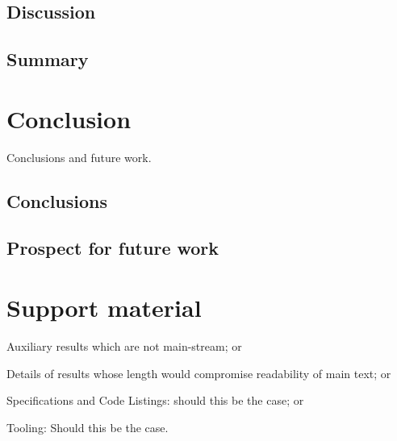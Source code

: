 \documentclass[oneside,11pt,a4paper,footinclude=true,headinclude=true,cleardoublepage=empty]{scrbook}
\begin{document}
    \section{Discussion}
	\section{Summary}

	\chapter{Conclusion}
		Conclusions and future work.
	\section{Conclusions}
	\section{Prospect for future work}
			

	

	
	
	
	\chapter{Support material}
	Auxiliary results which are not main-stream; or

	Details of results whose length would compromise readability of main text; or

	Specifications and Code Listings: should this be the case; or

	Tooling: Should this be the case.



\end{document}
